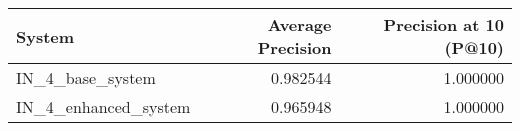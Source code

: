 \begin{tabular}{lrr}
\toprule
System & Average Precision & Precision at 10 (P@10) \\
\midrule
IN_4_base_system & 0.982544 & 1.000000 \\
IN_4_enhanced_system & 0.965948 & 1.000000 \\
\bottomrule
\end{tabular}

